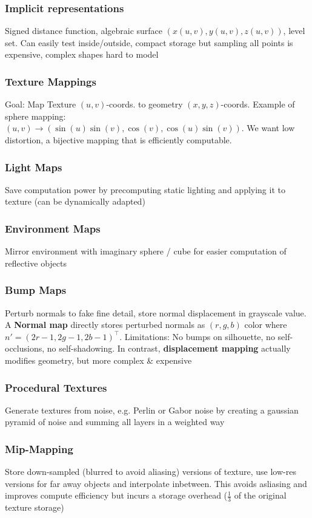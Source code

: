 \documentclass[a4paper,10pt]{article}
\begin{document}
\subsubsection{Implicit representations} Signed distance function, algebraic surface \( (x(u,v), y(u,v), z(u,v)) \), level set. Can easily test inside/outside, compact storage but sampling all points is expensive, complex shapes hard to model
\subsubsection{Texture Mappings} Goal: Map Texture \( (u,v) \)-coords. to geometry \( (x,y,z) \)-coords. Example of sphere mapping: \\\( (u,v) \to (\sin (u) \sin (v), \cos (v), \cos (u) \sin (v)) \). We want low distortion, a bijective mapping that is efficiently computable.
\subsubsection{Light Maps} Save computation power by precomputing static lighting and applying it to texture (can be dynamically adapted)
\subsubsection{Environment Maps} Mirror environment with imaginary sphere / cube for easier computation of reflective objects
\subsubsection{Bump Maps} Perturb normals to fake fine detail, store normal displacement in grayscale value. A \textbf{Normal map} directly stores perturbed normals as \( (r,g,b) \) color where \( n' = (2r - 1, 2g - 1, 2b -1)^\top \). Limitations: No bumps on silhouette, no self-occlusions, no self-shadowing. In contrast, \textbf{displacement mapping} actually modifies geometry, but more complex \& expensive
\subsubsection{Procedural Textures} Generate textures from noise, e.g. Perlin or Gabor noise by creating a gaussian pyramid of noise and summing all layers in a weighted way
\subsubsection{Mip-Mapping} Store down-sampled (blurred to avoid aliasing) versions of texture, use low-res versions for far away objects and interpolate inbetween. This avoids asliasing and improves compute efficiency but incurs a storage overhead (\( \frac{1}{3} \) of the original texture storage)
\end{document}
